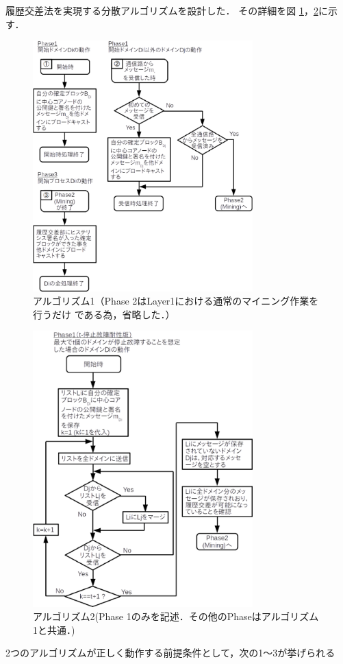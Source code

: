 \documentclass[a4paper,12pt]{jsarticle}
\begin{document}
履歴交差法を実現する分散アルゴリズム\cite{manabe}を設計した．
その詳細を図 \ref{fig:algorithm1}，\ref{fig:algorithm2}に示す．
%
\begin{figure}[h]
  \begin{center}
    \includegraphics[width=85mm]{pht/flow_chart-algorithm1.eps}
  \end{center}
  \caption{アルゴリズム1（Phase 2はLayer1における通常のマイニング作業を行うだけ
	である為，省略した．）}
  \label{fig:algorithm1}
\end{figure}
%
%
\begin{figure}[h]
  \begin{center}
    \includegraphics[width=85mm]{pht/flow_chart-algorithm2.eps}
  \end{center}
  \caption{アルゴリズム2(Phase 1のみを記述．その他のPhaseはアルゴリズム1と共通．)}
  \label{fig:algorithm2}
\end{figure}
%
 2つのアルゴリズムが正しく動作する前提条件として，次の1〜3が挙げられる
\end{document}

